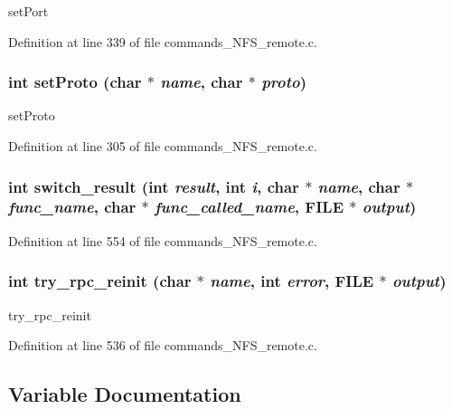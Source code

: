 setPort 

Definition at line 339 of file commands\_\-NFS\_\-remote.c.
\subsubsection[{setProto}]{\setlength{\rightskip}{0pt plus 5cm}int setProto (char $\ast$ {\em name}, \/  char $\ast$ {\em proto})}\label{commands__NFS__remote_8c_54178d13d361fe5b0d566cca44760f21}


setProto 

Definition at line 305 of file commands\_\-NFS\_\-remote.c.
\subsubsection[{switch\_\-result}]{\setlength{\rightskip}{0pt plus 5cm}int switch\_\-result (int {\em result}, \/  int {\em i}, \/  char $\ast$ {\em name}, \/  char $\ast$ {\em func\_\-name}, \/  char $\ast$ {\em func\_\-called\_\-name}, \/  FILE $\ast$ {\em output})}\label{commands__NFS__remote_8c_30ef541dd689d04487fd238c0a5d9dce}




Definition at line 554 of file commands\_\-NFS\_\-remote.c.
\subsubsection[{try\_\-rpc\_\-reinit}]{\setlength{\rightskip}{0pt plus 5cm}int try\_\-rpc\_\-reinit (char $\ast$ {\em name}, \/  int {\em error}, \/  FILE $\ast$ {\em output})}\label{commands__NFS__remote_8c_24a3727e813049c3490dd48684694b43}


try\_\-rpc\_\-reinit 

Definition at line 536 of file commands\_\-NFS\_\-remote.c.

\subsection{Variable Documentation}
